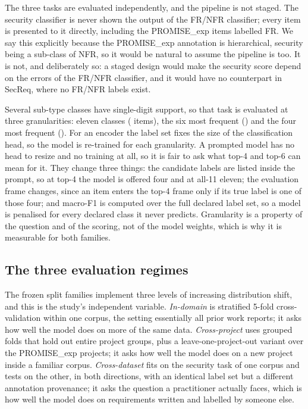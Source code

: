 \documentclass[conference]{IEEEtran}
\newcommand{\pex}{PROMISE\_exp}
\newcommand{\Fm}{macro-F1}
\begin{document}
The three tasks are evaluated independently, and the pipeline is not staged. The
security classifier is never shown the output of the FR/NFR classifier; every
item is presented to it directly, including the \nNfrPromise{} \pex{} items
labelled FR. We say this explicitly because the \pex{} annotation is
hierarchical, security being a sub-class of NFR, so it would be natural to assume
the pipeline is too. It is not, and deliberately so: a staged design would make
the security score depend on the errors of the FR/NFR classifier, and it would
have no counterpart in SecReq, where no FR/NFR labels exist.

Several sub-type classes have single-digit support, so that task is evaluated at
three granularities: eleven classes (\nNsubtypeall{} items), the six most
frequent (\nNsubtypesix) and the four most frequent (\nNsubtypefour). For an
encoder the label set fixes the size of the classification head, so the model is
re-trained for each granularity. A prompted model has no head to resize and no
training at all, so it is fair to ask what top-4 and top-6 can mean for it. They
change three things: the candidate labels are listed inside the prompt, so at
top-4 the model is offered four and at all-11 eleven; the evaluation frame
changes, since an item enters the top-4 frame only if its true label is one of
those four; and \Fm{} is computed over the full declared label set, so a model is
penalised for every declared class it never predicts. Granularity is a property
of the question and of the scoring, not of the model weights, which is why it is
measurable for both families.

\subsection{The three evaluation regimes}
\label{sec:regimes}
The \nNsplitfam{} frozen split families implement three levels of increasing
distribution shift, and this is the study's independent variable.
\emph{In-domain} is stratified 5-fold cross-validation within one corpus, the
setting essentially all prior work reports; it asks how well the model does on
more of the same data. \emph{Cross-project} uses grouped folds that hold out
entire project groups, plus a leave-one-project-out variant over the
\nNpromiseProj{} \pex{} projects; it asks how well the model does on a new
project inside a familiar corpus. \emph{Cross-dataset} fits on the security task
of one corpus and tests on the other, in both directions, with an identical label
set but a different annotation provenance; it asks the question a practitioner
actually faces, which is how well the model does on requirements written and
labelled by someone else.
\end{document}

